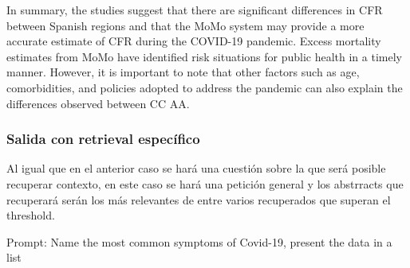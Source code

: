 In summary, the studies suggest that there are significant differences in CFR between Spanish regions and that the MoMo system may provide a more accurate estimate of CFR during the COVID-19 pandemic. Excess mortality estimates from MoMo have identified risk situations for public health in a timely manner. However, it is important to note that other factors such as age, comorbidities, and policies adopted to address the pandemic can also explain the differences observed between CC AA.


\subsubsection{Salida con retrieval específico}

Al igual que en el anterior caso se hará una cuestión sobre la que será posible recuperar contexto, en este caso se hará una petición general y los abstrracts que recuperará serán los más relevantes de entre varios recuperados que superan el threshold.

Prompt: Name the most common symptoms of Covid-19, present the data in a list

